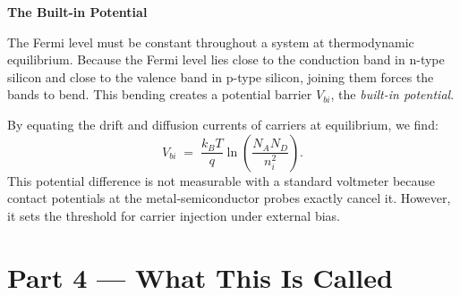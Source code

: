 \documentclass[12pt, a4paper]{book}
\newcommand{\newterm}[1]{\textit{\textcolor{DiscoveryColor}{#1}}}
\begin{document}
\begin{discoverybox}
\textbf{The Built-in Potential}

The Fermi level must be constant throughout a system at thermodynamic equilibrium. Because the Fermi level lies close to the conduction band in n-type silicon and close to the valence band in p-type silicon, joining them forces the bands to bend. This bending creates a potential barrier $V_{bi}$, the \newterm{built-in potential}.

\begin{center}
\end{center}

By equating the drift and diffusion currents of carriers at equilibrium, we find:
\[
  V_{bi} \;=\; \frac{k_B T}{q} \ln\left(\frac{N_A N_D}{n_i^2}\right).
\]
This potential difference is not measurable with a standard voltmeter because contact potentials at the metal-semiconductor probes exactly cancel it. However, it sets the threshold for carrier injection under external bias.
\end{discoverybox}

\newpage

\section{Part 4 --- What This Is Called}
\end{document}

